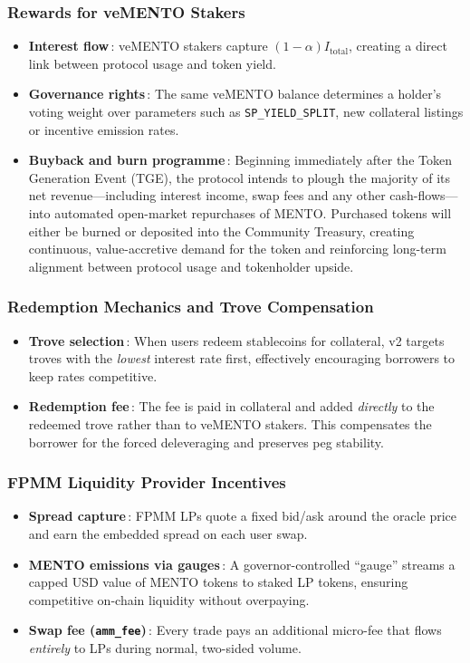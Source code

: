 \documentclass[a4paper]{article}
\providecommand{\hyp}{-}
\theoremstyle{definition}
\begin{document}
\subsubsection*{Rewards for veMENTO Stakers}
\begin{itemize}
  \item \textbf{Interest flow}\,:  veMENTO stakers capture $(1-\alpha) I_{\mathrm{total}}$, creating a direct link between protocol usage and token yield.
  \item \textbf{Governance rights}\,:  The same veMENTO balance determines a holder's voting weight over parameters such as \texttt{SP\_YIELD\_SPLIT}, new collateral listings or incentive emission rates.
  \item \textbf{Buyback and burn programme}\,:  Beginning immediately after the Token Generation Event (TGE), the protocol intends to plough the majority of its net revenue—including interest income, swap fees and any other cash-flows—into automated open-market repurchases of MENTO.  Purchased tokens will either be burned or deposited into the Community Treasury, creating continuous, value-accretive demand for the token and reinforcing long-term alignment between protocol usage and tokenholder upside.
\end{itemize}

\subsubsection*{Redemption Mechanics and Trove Compensation}
\begin{itemize}
  \item \textbf{Trove selection}\,:  When users redeem stablecoins for collateral, v2 targets troves with the \emph{lowest} interest rate first, effectively encouraging borrowers to keep rates competitive.
  \item \textbf{Redemption fee}\,:  The fee is paid in collateral and added \emph{directly} to the redeemed trove rather than to veMENTO stakers.  This compensates the borrower for the forced deleveraging and preserves peg stability.
\end{itemize}

\subsubsection*{FPMM Liquidity Provider Incentives}
\begin{itemize}
  \item \textbf{Spread capture}\,:  FPMM LPs quote a fixed bid/ask around the oracle price and earn the embedded spread on each user swap.
  \item \textbf{MENTO emissions via gauges}\,:  A governor\hyp controlled ``gauge'' streams a capped USD value of MENTO tokens to staked LP tokens, ensuring competitive on\hyp chain liquidity without overpaying.
  \item \textbf{Swap fee (\texttt{amm\_fee})}\,:  Every trade pays an additional micro\hyp fee that flows \emph{entirely} to LPs during normal, two\hyp sided volume.
\end{itemize}
\end{document}
